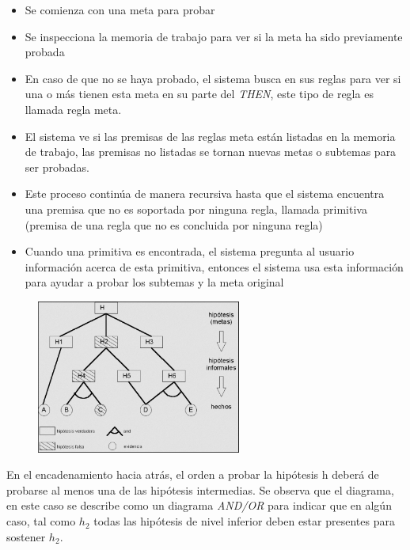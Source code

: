 \documentclass[12 pt, a4paper]{article}
\begin{document}
			\begin{itemize}
				\item Se comienza con una meta para probar\\
				\item Se inspecciona la memoria de trabajo para ver si la meta ha sido     previamente probada\\
				\item En caso de que no se haya probado, el sistema busca en sus reglas para ver si     una o más tienen esta meta en su parte del \emph{THEN}, este tipo de regla     es llamada regla meta.\\
				\item El sistema ve si las premisas de las reglas meta están listadas en la memoria     de trabajo, las premisas no listadas se tornan nuevas metas o     subtemas para ser probadas.\\
				\item Este proceso continúa de manera recursiva hasta que el sistema encuentra una     premisa que no es soportada por ninguna regla, llamada primitiva     (premisa de una regla que no es concluida por ninguna regla)\\
				\item Cuando una primitiva es encontrada, el sistema pregunta al usuario información     acerca de esta primitiva, entonces el sistema usa esta información     para ayudar a probar los subtemas y la meta original\\
			\end{itemize}	
				\begin{figure}[h]
					\centering
					\includegraphics[width=0.6\textwidth]{./section2/fig8.png}
				\end{figure}
			
			En el encadenamiento hacia atrás, el orden a probar la hipótesis h deberá de probarse al menos una de las hipótesis intermedias. Se observa que el diagrama, en este caso se describe como un diagrama \emph{AND/OR} para indicar que en algún caso, tal como $h_{2}$ todas las hipótesis de nivel inferior deben estar presentes para sostener $h_{2}$.
	
\end{document}
